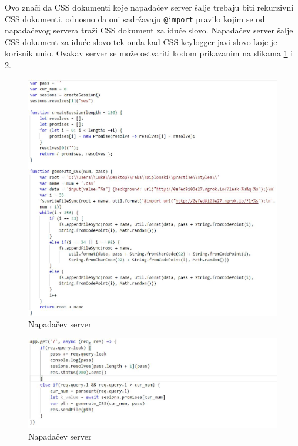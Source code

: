 \documentclass[12pt, oneside, onecolumn]{book}
\begin{document}
{Ovo znači da CSS dokumenti koje napadačev server šalje trebaju biti rekurzivni CSS dokumenti, odnosno da oni sadržavaju \texttt{@import} pravilo kojim se od napadačevog servera traži CSS dokument za iduće slovo. Napadačev server šalje CSS dokument za iduće slovo tek onda kad CSS keylogger javi slovo koje je korisnik unio. Ovakav server se može ostvariti kodom prikazanim na slikama \ref{fig:css_ser} i \ref{fig:css_ser3}.

\begin{figure}[H]
	\begin{center}
		\includegraphics[width=\textwidth]{css_ser.jpg}
		\caption{Napadačev server} \label{fig:css_ser}
	\end{center}
\end{figure}

\begin{figure}[H]
	\begin{center}
		\includegraphics[width=\textwidth]{css_ser3.jpg}
		\caption{Napadačev server} \label{fig:css_ser3}
	\end{center}
\end{figure}

}
\end{document}
